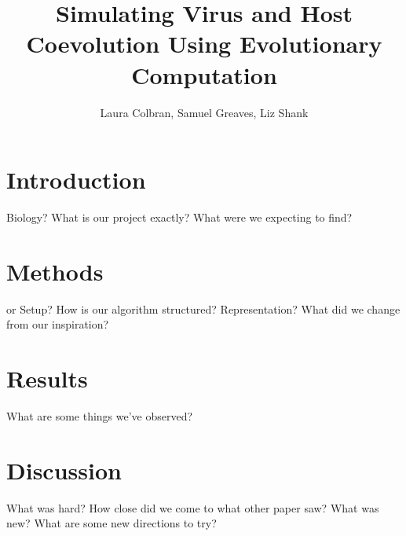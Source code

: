 \documentclass[11pt, oneside]{article}   	%
\title{Simulating Virus and Host Coevolution Using Evolutionary Computation}
\author{Laura Colbran, Samuel Greaves, Liz Shank}
\date{}							%
\begin{document}
\maketitle
\section{Introduction}
Biology? What is our project exactly? What were we expecting to find?

\section{Methods}
or Setup? How is our algorithm structured? Representation? What did we change from our inspiration?

\section{Results}
What are some things we've observed?

\section{Discussion}
What was hard? How close did we come to what other paper saw? What was new? What are some new directions to try? 
\end{document}
